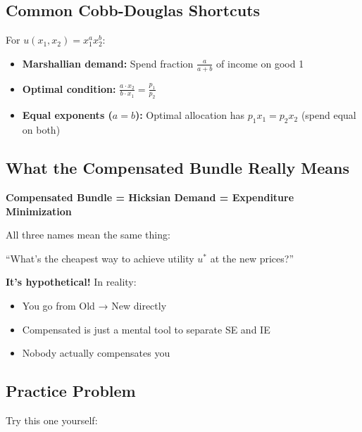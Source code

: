 \documentclass[11pt]{article}
\begin{document}
\subsection{Common Cobb-Douglas Shortcuts}

For $u(x_1, x_2) = x_1^a x_2^b$:

\begin{itemize}[leftmargin=2cm]
    \item \textbf{Marshallian demand:} Spend fraction $\frac{a}{a+b}$ of income on good 1

    \item \textbf{Optimal condition:} $\frac{a \cdot x_2}{b \cdot x_1} = \frac{p_1}{p_2}$

    \item \textbf{Equal exponents ($a=b$):} Optimal allocation has $p_1 x_1 = p_2 x_2$ (spend equal on both)
\end{itemize}

\subsection{What the Compensated Bundle Really Means}

\begin{center}
\colorbox{yellow!20}{
\begin{minipage}{0.9\textwidth}
\textbf{Compensated Bundle = Hicksian Demand = Expenditure Minimization}

All three names mean the same thing:

``What's the cheapest way to achieve utility $u^*$ at the new prices?''
\end{minipage}
}
\end{center}

\vspace{1em}

\textbf{It's hypothetical!} In reality:
\begin{itemize}
    \item You go from Old → New directly
    \item Compensated is just a mental tool to separate SE and IE
    \item Nobody actually compensates you
\end{itemize}

\subsection{Practice Problem}

Try this one yourself:
\end{document}
